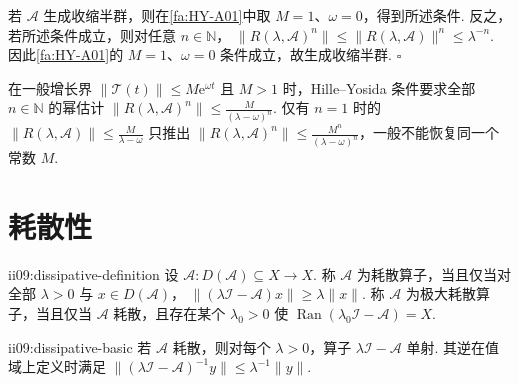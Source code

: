 \begin{FAProof}
若 \(\displaystyle\mathcal A\) 生成收缩半群，则在\autoref{fa:HY-A01}中取 \(\displaystyle M=1\)、\(\displaystyle\omega=0\)，得到所述条件. 反之，若所述条件成立，则对任意 \(\displaystyle n\in\mathbb N\)， \(\displaystyle \|R(\lambda,\mathcal A)^n\| \leqslant \|R(\lambda,\mathcal A)\|^n \leqslant \lambda^{-n}.\)
因此\autoref{fa:HY-A01}的 \(\displaystyle M=1\)、\(\displaystyle\omega=0\) 条件成立，故生成收缩半群.
\hfill\(\square\)
\end{FAProof}

\begin{FAWarning}
在一般增长界 \(\displaystyle\|\mathcal T(t)\|\leqslant M\mathrm{e}^{\omega t}\) 且 \(\displaystyle M>1\) 时，Hille--Yosida 条件要求全部 \(\displaystyle n\in\mathbb N\) 的幂估计 \(\displaystyle \|R(\lambda,\mathcal A)^n\| \leqslant \frac{M}{(\lambda-\omega)^n}.\)
仅有 \(\displaystyle n=1\) 时的 \(\displaystyle\|R(\lambda,\mathcal A)\|\leqslant \frac{M}{\lambda-\omega}\) 只推出 \(\displaystyle\|R(\lambda,\mathcal A)^n\|\leqslant \frac{M^n}{(\lambda-\omega)^n}\)，一般不能恢复同一个常数 \(\displaystyle M\).
\end{FAWarning}

\section{耗散性}\label{sec:ii09-dissipativity}

\begin{FADefinition}[A][耗散与极大耗散]{ii09:dissipative-definition}
设 \(\displaystyle \mathcal A:D(\mathcal A)\subseteq X\to X.\)
称 \(\displaystyle\mathcal A\) 为耗散算子，当且仅当对全部 \(\displaystyle\lambda>0\) 与 \(\displaystyle x\in D(\mathcal A)\)， \(\displaystyle \|(\lambda\mathcal I-\mathcal A)x\| \geqslant \lambda\|x\|.\)
称 \(\displaystyle\mathcal A\) 为极大耗散算子，当且仅当 \(\displaystyle\mathcal A\) 耗散，且存在某个 \(\displaystyle\lambda_0>0\) 使 \(\displaystyle \operatorname{Ran}(\lambda_0\mathcal I-\mathcal A)=X.\)
\end{FADefinition}

\begin{FAProposition}[C][耗散性给出的单射与逆估计]{ii09:dissipative-basic}
若 \(\displaystyle\mathcal A\) 耗散，则对每个 \(\displaystyle\lambda>0\)，算子 \(\displaystyle\lambda\mathcal I-\mathcal A\) 单射. 其逆在值域上定义时满足 \(\displaystyle \|(\lambda\mathcal I-\mathcal A)^{-1}y\| \leqslant \lambda^{-1}\|y\|.\)
\end{FAProposition}

